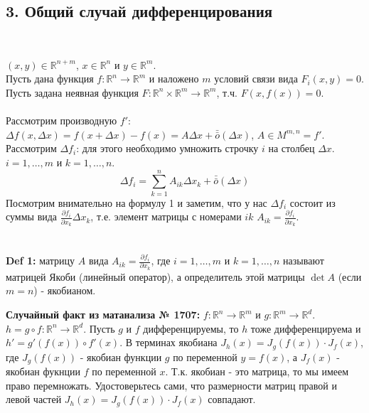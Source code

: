 \documentclass[book, 11pt]{report}
\begin{document}
    \subsection*{3. Общий случай дифференцирования}
    \par{\ }
    \par{
    $(x,y)\in\mathbb{R}^{n+m}$, $x\in\mathbb{R}^n$ и $y\in\mathbb{R}^m$. \\ Пусть дана функция $f:\mathbb{R}^n\to\mathbb{R}^m$ и наложено $m$ условий связи вида $F_i(x,y)=0$. \\ Пусть задана неявная функция $F:\mathbb{R}^n\times\mathbb{R}^m\to\mathbb{R}^m$, т.ч. $F(x,f(x))=0$.\\ \\Рассмотрим производную $f'$: \\
    $\Delta f(x,\Delta x)=f(x+\Delta x)-f(x)=A\Delta x+\bar{\bar{o}}(\Delta x)$, $A\in M^{m,n}=f'$. Рассмотрим $\Delta f_i$: для этого необходимо умножить строчку $i$ на столбец $\Delta x$. $i=1,\ldots,m$ и $k=1,\ldots,n$.
    \begin{equation}
        \displaystyle\Delta f_i=\sum_{k=1}^nA_{ik}\Delta x_k+\bar{\bar{o}}(\Delta x)
    \end{equation}
    Посмотрим внимательно на формулу 1 и заметим, что у нас $\Delta f_i$ состоит из суммы вида $\frac{\partial f_i}{\partial x_k}\Delta x_k$, т.е. элемент матрицы с номерами $ik$ $\displaystyle A_{ik}=\frac{\partial f_i}{\partial x_k}$. \\ \\ \\
    \textbf{Def 1: } матрицу $A$ вида $\displaystyle A_{ik}=\frac{\partial f_i}{\partial x_k}$, где $i=1,\ldots,m$ и $k=1,\ldots,n$ называют матрицей Якоби (линейный оператор), а определитель этой матрицы $\det A$ (если $m=n$) - якобианом.}
    \vspace{0.5cm}
    \par{
    \textbf{Случайный факт из матанализа № 1707: } $f:\mathbb{R}^n\to\mathbb{R}^m$ и $g:\mathbb{R}^m\to\mathbb{R}^d$. $h=g\circ f:\mathbb{R}^n\to\mathbb{R}^d$. Пусть $g$ и $f$ дифференцируемы, то $h$ тоже дифференцируема и $h'=g'(f(x))\circ f'(x)$. В терминах якобиана $J_h(x)=J_g(f(x))\cdot J_f(x)$, где $J_g(f(x))$ - якобиан функции $g$ по переменной $y = f(x)$, а $J_f(x)$ - якобиан фукнции $f$ по переменной $x$. Т.к. якобиан - это матрица, то мы имеем право перемножать. Удостоверьтесь сами, что размерности матриц правой и левой частей $J_h(x)=J_g(f(x))\cdot J_f(x)$ совпадают.
    }
\end{document}
